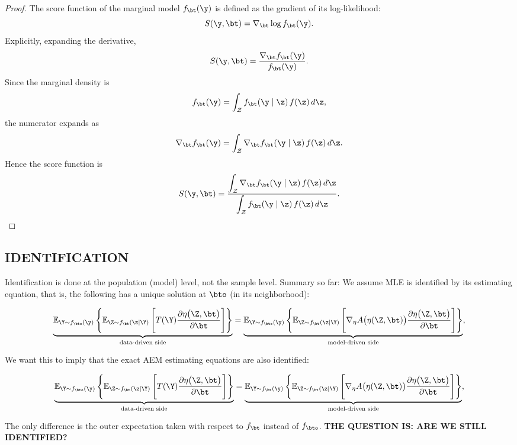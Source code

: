 \begin{proof}
The score function of the marginal model $f_\bt(\y)$ is defined as the gradient of its log-likelihood:
\[
S(\y, \bt)
=
\nabla_\bt \log f_\bt(\y).
\]
Explicitly, expanding the derivative,
\[
S(\y, \bt)
=
\frac{
    \displaystyle \nabla_\bt f_\bt(\y)
}{
    \displaystyle f_\bt(\y)
}.
\]
Since the marginal density is
\[
f_\bt(\y) = \int_{\mathcal Z} f_\bt(\y \mid \z) \, f(\z)\, d\z,
\]
the numerator expands as
\[
\nabla_\bt f_\bt(\y)
=
\int_{\mathcal Z}
\nabla_\bt f_\bt(\y \mid \z)
\, f(\z)\, d\z.
\]
Hence the score function is
\[
S(\y, \bt)
=
\frac{
    \displaystyle \int_{\mathcal Z}
    \nabla_\bt f_\bt(\y \mid \z)\, f(\z)\, d\z
}{
    \displaystyle \int_{\mathcal Z}
    f_\bt(\y \mid \z)\, f(\z)\, d\z
}.
\]

\end{proof}

\subsection{IDENTIFICATION}
Identification is done at the population (model) level, not the sample level. Summary so far: We assume MLE is identified by its estimating equation, that is, the following has a unique solution at $\bto$ (in its neighborhood):

\[
\underbrace{
\mathbb{E}_{\Y \sim f_{\bto}(\y)}
\left\{
\mathbb{E}_{\Z \sim f_{\bt}(\z \mid \Y)}
\left[
    T(\Y)
    \frac{\partial \eta\bigl(\Z, \bt\bigr)}{\partial \bt}
\right]
\right\}
}_{\text{data-driven side}}
=
\underbrace{
\mathbb{E}_{\Y \sim f_{\bto}(\y)}
\left\{
\mathbb{E}_{\Z \sim f_{\bt}(\z \mid \Y)}
\left[
    \nabla_\eta A\bigl(\eta(\Z, \bt)\bigr)
    \frac{\partial \eta\bigl(\Z, \bt\bigr)}{\partial \bt}
\right]
\right\}
}_{\text{model-driven side}},
\]

\noindent
We want this to imply that the exact AEM estimating equations are also identified:

\[
\underbrace{
\mathbb{E}_{\Y \sim f_{\bto}(\y)}
\left\{
\mathbb{E}_{\Z \sim f_{\bt}(\z \mid \Y)}
\left[
    T(\Y)
    \frac{\partial \eta\bigl(\Z, \bt\bigr)}{\partial \bt}
\right]
\right\}
}_{\text{data-driven side}}
=
\underbrace{
\mathbb{E}_{\Y \sim f_{\bt}(\y)}
\left\{
\mathbb{E}_{\Z \sim f_{\bt}(\z \mid \Y)}
\left[
    \nabla_\eta A\bigl(\eta(\Z, \bt)\bigr)
    \frac{\partial \eta\bigl(\Z, \bt\bigr)}{\partial \bt}
\right]
\right\}
}_{\text{model-driven side}},
\]

\noindent
The only difference is the outer expectation taken with respect to $f_\bt$ instead of $f_\bto$. \textbf{THE QUESTION IS: ARE WE STILL IDENTIFIED?}




